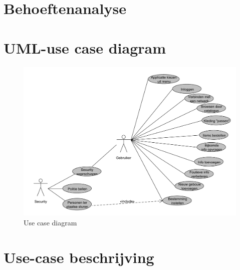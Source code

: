 \documentclass[12pt,a4paper,oneside]{article}
\begin{document}

\pagestyle{fancy}
\fancyhf{}
\fancyfoot[R]{\small \thepage / \pageref{LastPage}}
\section*{Behoeftenanalyse}
\section{UML-use case diagram}
\begin{figure}[H]
  \begin{center}
    \includegraphics[width=\textwidth]{use_case_diagram2-eps-converted-to.pdf}
    \caption{Use case diagram}
    \label{graph:graph1}
  \end{center}
\end{figure}
\section{Use-case beschrijving}
\setcounter{section}{1}
\end{document}
